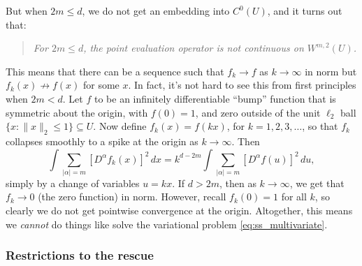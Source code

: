 \documentclass{article}
\begin{document}
But when $2m \leq d$, we do not get an embedding into $C^0(U)$, and it turns out
that:   
\begin{quote}
\centering\it
For $2m \leq d$, the point evaluation operator is not continuous on
$W^{m,2}(U)$.  
\end{quote}
This means that there can be a sequence such that $f_k \to f$ as $k \to \infty$
in  norm but $f_k(x) \not\to f(x)$ for some
$x$. In fact, it's not hard to see this from first principles when $2m < d$.
Let $f$ to be an infinitely differentiable ``bump'' function that is symmetric
about the origin, with $f(0) = 1$, and zero outside of the unit $\ell_2$ ball
$\{x : \|x\|_2 \leq 1\} \subseteq U$. Now define $f_k(x) = f(k x)$, for
$k=1,2,3,\dots$, so that $f_k$ collapses smoothly to a spike at the origin as $k 
\to \infty$. Then
\[
\int \sum_{|\alpha| = m} [D^\alpha f_k(x)]^2 \, dx = 
k^{d-2m} \int \sum_{|\alpha| = m} [D^\alpha f(u)]^2 \, du, 
\]
simply by a change of variables $u = k x$. If $d > 2m$, then as $k \to \infty$,
we get that $f_k \to 0$ (the zero function) in 
norm. However, recall $f_k(0) = 1$ for all $k$, so clearly we do not get
pointwise convergence at the origin. Altogether, this means we \emph{cannot} do
things like solve the variational problem \eqref{eq:ss_multivariate}.  

\subsubsection{Restrictions to the rescue}
\end{document}
